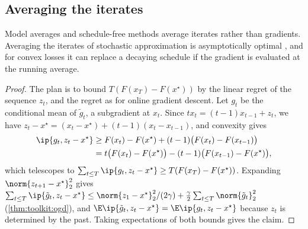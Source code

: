 \begin{refsection}
\subsection{Averaging the iterates}

Model averages and schedule-free methods average iterates rather than gradients. Averaging the iterates of stochastic approximation is asymptotically optimal \parencite{PolyakJuditsky1992}, and for convex losses it can replace a decaying schedule if the gradient is evaluated at the running average.


\begin{proof}
The plan is to bound $T(F(x_T)-F(x^\star))$ by the linear regret of the sequence $z_t$, and the regret as for online gradient descent. Let $g_t$ be the conditional mean of $\tilde g_t$, a subgradient at $x_t$. Since $tx_t=(t-1)x_{t-1}+z_t$, we have $z_t-x^\star=(x_t-x^\star)+(t-1)(x_t-x_{t-1})$, and convexity gives
\[
\begin{aligned}
  \ip{g_t,z_t-x^\star}&\ge F(x_t)-F(x^\star)+(t-1)\bigl(F(x_t)-F(x_{t-1})\bigr)\\
  &=t\bigl(F(x_t)-F(x^\star)\bigr)-(t-1)\bigl(F(x_{t-1})-F(x^\star)\bigr),
\end{aligned}
\]
which telescopes to $\sum_{t\le T}\ip{g_t,z_t-x^\star}\ge T(F(x_T)-F(x^\star))$. Expanding $\norm{z_{t+1}-x^\star}_2^2$ gives $\sum_{t\le T}\ip{\tilde g_t,z_t-x^\star}\le\norm{z_1-x^\star}_2^2/(2\gamma)+\frac\gamma2\sum_{t\le T}\norm{\tilde g_t}_2^2$ (\cref{thm:toolkit:ogd}), and $\E\ip{\tilde g_t,z_t-x^\star}=\E\ip{g_t,z_t-x^\star}$ because $z_t$ is determined by the past. Taking expectations of both bounds gives the claim.
\end{proof}


\end{refsection}
